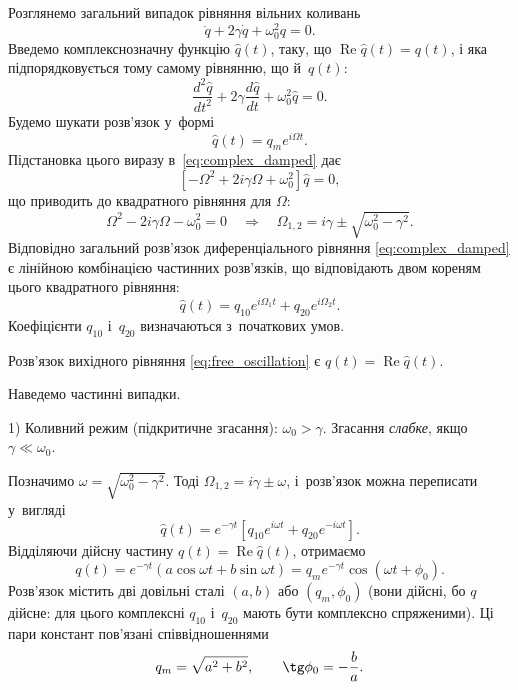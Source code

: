 Розглянемо загальний випадок рівняння вільних коливань
\begin{equation*}
	\ddot{q} + 2\gamma\dot{q} + \omega_0^2 q = 0.
\end{equation*}
Введемо комплекснозначну функцію $\hat{q}(t)$, таку, що $\operatorname{Re}\hat{q}(t) = q(t)$, і
яка підпорядковується тому самому рівнянню, що й~$q(t)$:
\begin{equation}\label{eq:complex_damped}
	\frac{d^2\hat{q}}{dt^2} + 2\gamma\frac{d\hat{q}}{dt} + \omega_0^2\hat{q} = 0.
\end{equation}
Будемо шукати розв'язок у~формі
\begin{equation*}
	\hat{q}(t) = q_m e^{i\Omega t}.
\end{equation*}
Підстановка цього виразу в~\eqref{eq:complex_damped} дає
\begin{equation*}
	\left[-\Omega^2 + 2i\gamma\Omega + \omega_0^2\right]\hat{q} = 0,
\end{equation*}
що приводить до квадратного рівняння для $\Omega$:
\begin{equation*}
	\Omega^2 - 2i\gamma\Omega - \omega_0^2 = 0
	\quad\Rightarrow\quad
	\Omega_{1,2} = i\gamma \pm \sqrt{\omega_0^2 - \gamma^2}.
\end{equation*}
Відповідно загальний розв'язок диференціального рівняння \eqref{eq:complex_damped}
є лінійною комбінацією частинних розв'язків, що відповідають двом кореням
цього квадратного рівняння:
\begin{equation*}
	\hat{q}(t) = q_{10} e^{i\Omega_1 t} + q_{20} e^{i\Omega_2 t}.
\end{equation*}
Коефіцієнти $q_{10}$ і~$q_{20}$ визначаються з~початкових умов.

Розв'язок вихідного рівняння \eqref{eq:free_oscillation} є $q(t) = \operatorname{Re}\hat{q}(t)$.

Наведемо частинні випадки.

1) Коливний режим (підкритичне згасання): $\omega_0 > \gamma$. Згасання \emph{слабке}, якщо $\gamma \ll \omega_0$.

Позначимо $\omega = \sqrt{\omega_0^2 - \gamma^2}$. Тоді $\Omega_{1,2} = i\gamma \pm
\omega$, і~розв'язок можна переписати у~вигляді
\begin{equation*}
	\hat{q}(t) = e^{-\gamma t}\left[q_{10} e^{i\omega t} + q_{20} e^{-i\omega t}\right].
\end{equation*}
Відділяючи дійсну частину $q(t) = \operatorname{Re}\hat{q}(t)$, отримаємо
\begin{equation*}
	q(t) = e^{-\gamma t}\left(a\cos\omega t + b\sin\omega t\right) = q_m e^{-\gamma t}\cos(\omega t + \phi_0).
\end{equation*}
Розв'язок містить дві довільні сталі $(a, b)$ або $(q_m, \phi_0)$ (вони дійсні, бо $q$ дійсне: для цього комплексні $q_{10}$ і~$q_{20}$ мають бути комплексно спряженими).
Ці пари констант пов'язані співвідношеннями
\begin{equation*}
	q_m = \sqrt{a^2 + b^2}, \qquad \tg\phi_0 = -\frac{b}{a}.
\end{equation*}

